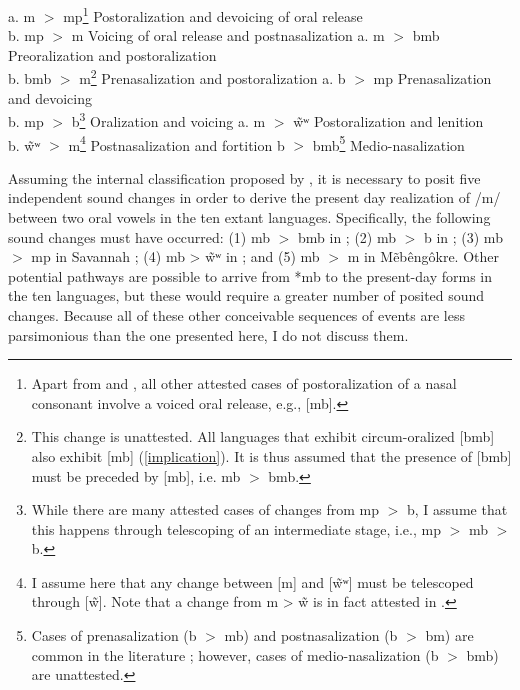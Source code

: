 \documentclass[output=paper,hidelinks]{langscibook}
\begin{document}
\ea\label{14} a. m $>$ mp\footnote{Apart from  and , all other attested cases of postoralization of a nasal consonant involve a voiced oral release, e.g., [mb].} 	\hspace{.8cm} 			Postoralization and devoicing of oral release \\
b. mp $>$ m	\hspace{1.06cm}			Voicing of oral release and postnasalization
\ex\label{15} a. m $>$ bmb	\hspace{.88cm}			Preoralization and postoralization	\\
b. bmb $>$ m\footnote{This change is unattested. All languages that exhibit circum-oralized [bmb] also exhibit [mb] (\ref{implication}). It is thus assumed that the presence of [bmb] must be preceded by [mb], i.e. mb $>$ bmb.} 	\hspace{.60cm}			Prenasalization and postoralization	
\ex\label{16} a. b $>$ mp	\hspace{1.17cm}			Prenasalization and devoicing	\\
	b. mp $>$ b\footnote{While there are many attested cases of changes from mp $>$ b, I assume that this happens through telescoping of an intermediate stage, i.e., mp $>$ mb $>$ b.} 	\hspace{.89cm}			Oralization and voicing
\ex\label{17} a. m $>$ \~wʷ	\hspace{1.06cm}			Postoralization and lenition	\\
	b. \~wʷ $>$ m\footnote{I assume here that any change between [m] and [\~wʷ] must be telescoped through [\~w]. Note that a change from m > \~w is in fact attested in .} 	\hspace{.75cm}			Postnasalization and fortition
\ex\label{18} b $>$ bmb\footnote{Cases of prenasalization (b $>$ mb) and postnasalization (b $>$ bm) are common in the literature \citep{WetzelsNevins2018}; however, cases of medio-nasalization (b $>$ bmb) are unattested.} 	\hspace{1.05cm}			Medio-nasalization
\z


Assuming the internal classification proposed by \citet{Lapierre2016}, it is necessary to posit five independent sound changes in order to derive the present day realization of /m/ between two oral vowels in the ten extant  languages. Specifically, the following sound changes must have occurred: (1) mb $>$ bmb in ; (2) mb $>$ b in ; (3) mb $>$ mp in Savannah ; (4) mb > \~wʷ in ; and (5) mb $>$ m in M\~eb\^eng\^okre. Other potential pathways are possible to arrive from *mb to the present-day forms in the ten  languages, but these would require a greater number of posited sound changes. Because all of these other conceivable sequences of events are less parsimonious than the one presented here, I do not discuss them.
\end{document}
